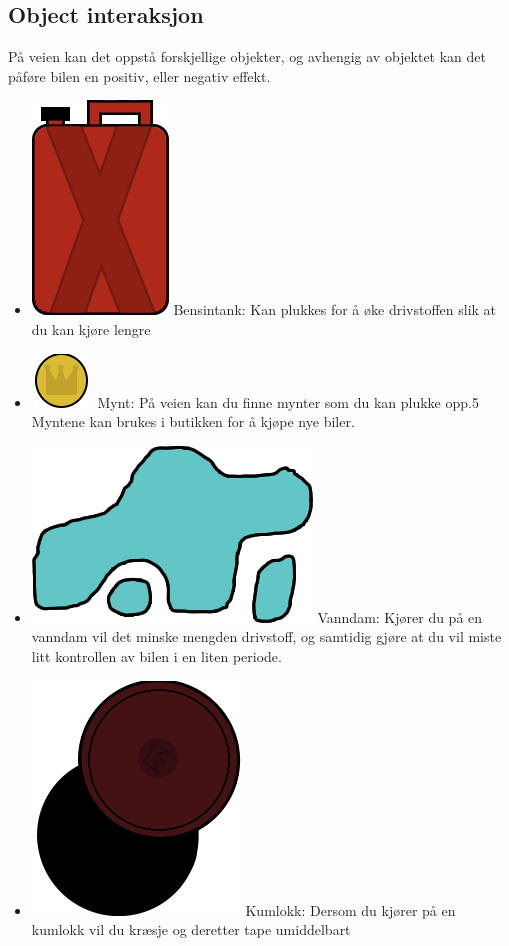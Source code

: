 \documentclass[paper=a4]{article}
\begin{document}
\subsection{Object interaksjon}
På veien kan det oppstå forskjellige objekter, og avhengig av objektet kan det påføre bilen en positiv, eller negativ effekt. \\
\begin{itemize}
	\item \includegraphics[scale=0.2]{images/gastank.png} Bensintank: Kan plukkes for å øke drivstoffen slik at du kan kjøre lengre 
	\item \includegraphics[scale=0.5]{images/coin.png} Mynt: På veien kan du finne mynter som du kan plukke opp.5
																Myntene kan brukes i butikken for å kjøpe nye biler.
	\item \includegraphics[scale=0.2]{images/puddle.png} Vanndam: Kjører du på en vanndam vil det minske mengden drivstoff,
																og samtidig gjøre at du vil miste litt kontrollen av bilen i en liten periode. 
	\item \includegraphics[scale=0.2]{images/manhole.png} Kumlokk: Dersom du kjører på en kumlokk vil du kræsje og deretter tape umiddelbart

\end{itemize}
\end{document}
